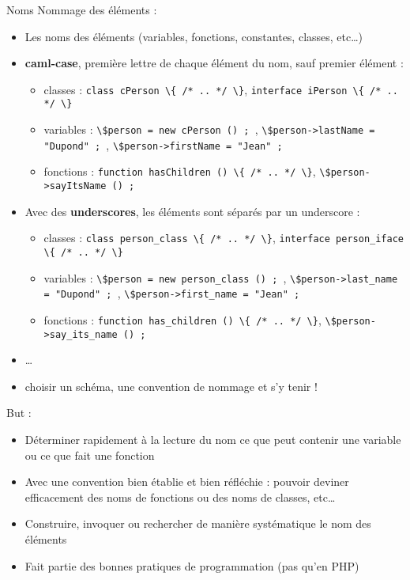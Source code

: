 \begin{frame}{Noms}
	Nommage des éléments :
	\begin{itemize}
		\item Les noms des éléments (variables, fonctions, constantes, classes, etc…)
		\item \textbf{caml-case}, première lettre de chaque élément du nom, sauf premier élément :
		\begin{itemize}
			\item classes : \lstinline&class cPerson \{ /* .. */ \}&, \lstinline&interface iPerson \{ /* .. */ \}&
			\item variables : \lstinline&\$person = new cPerson () ; &, \lstinline&\$person->lastName = "Dupond" ; &, \lstinline&\$person->firstName = "Jean" ;& 
			\item fonctions : \lstinline&function hasChildren () \{ /* .. */ \}&, \lstinline&\$person->sayItsName () ;&
		\end{itemize}
		\item Avec des \textbf{underscores}, les éléments sont séparés par un underscore :
		\begin{itemize}
			\item classes : \lstinline&class person_class \{ /* .. */ \}&, \lstinline&interface person_iface \{ /* .. */ \}&
			\item variables : \lstinline&\$person = new person_class () ; &, \lstinline&\$person->last_name = "Dupond" ; &, \lstinline&\$person->first_name = "Jean" ;& 
			\item fonctions : \lstinline&function has_children () \{ /* .. */ \}&, \lstinline&\$person->say_its_name () ;&
		\end{itemize}
		\item \ldots
		\item choisir un schéma, une convention de nommage et s’y tenir !
	\end{itemize}
	But :
	\begin{itemize}
		\item Déterminer rapidement à la lecture du nom ce que peut contenir une variable ou ce que fait une fonction
		\item Avec une convention bien établie et bien réfléchie : pouvoir deviner efficacement des noms de fonctions ou des noms de classes, etc…
		\item Construire, invoquer ou rechercher de manière systématique le nom des éléments
		\item Fait partie des bonnes pratiques de programmation (pas qu’en PHP)
	\end{itemize}
\end{frame}

